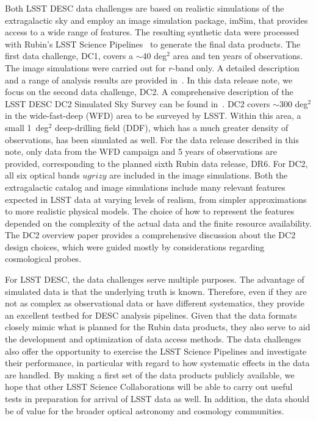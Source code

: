\documentclass[modern]{descnote}
\begin{document}
Both LSST DESC data challenges are based on realistic simulations of the extragalactic sky and employ an image simulation package, imSim, that provides access to a wide range of features. The resulting synthetic data were processed with Rubin's LSST Science Pipelines~\citep{2017ASPC..512..279J} to generate the final data products. The first data challenge, DC1, covers a $\sim$40 deg$^2$ area and ten years of observations. The image simulations were carried out for $r$-band only. A detailed description and a range of analysis results are provided in~\cite{dc1}.  In this data release note, we focus on the second data challenge, DC2. A comprehensive description of the LSST DESC DC2 Simulated Sky Survey can be found in~\cite{2020arXiv201005926L}. DC2 covers $\sim$300 deg$^2$ in the wide-fast-deep (WFD) area to be surveyed by LSST. Within this area, a small 1~deg$^2$ deep-drilling field (DDF), which has a much greater density of observations, has been simulated as well. For the data release described in this note, only data from the WFD campaign and 5 years of observations are provided, corresponding to the planned sixth Rubin data release, DR6. For DC2, all six optical bands $ugrizy$ are included in the image simulations. Both the extragalactic catalog and image simulations include many relevant features expected in LSST data at varying levels of realism, from simpler approximations to more realistic physical models.  The choice of how to represent the features depended on the complexity of the actual data and the finite resource availability. The DC2 overview paper \citep{2020arXiv201005926L} provides a comprehensive discussion about the DC2 design choices, which were guided mostly by considerations regarding cosmological probes.  

For LSST DESC, the data challenges serve multiple purposes. The advantage of simulated data is that the underlying truth is known. Therefore, even if they are not as complex as observational data or have different systematics, they provide an excellent testbed for DESC analysis pipelines. Given that the data formats closely mimic what is planned for the Rubin data products, they also serve to aid the development and optimization of data access methods. The data challenges also offer the opportunity to exercise the LSST Science Pipelines and investigate their performance, in particular with regard to how systematic effects in the data are handled. By making a first set of the data products publicly available, we hope that other LSST Science Collaborations will be able to carry out useful tests in preparation for arrival of LSST data as well. In addition, the data should be of value for the broader optical astronomy and cosmology communities.
\end{document}
